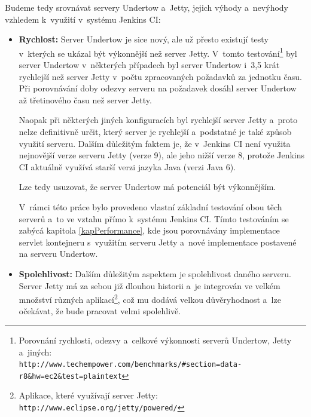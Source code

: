             \medskip
            Budeme tedy srovnávat servery Undertow a~Jetty, jejich výhody a~nevýhody
            vzhledem k~využití v~systému Jenkins CI:
            \begin{itemize}
                \item {\textbf{Rychlost:} Server Undertow je sice nový, ale už přesto existují
                    testy v~kterých se ukázal být výkonnější než server Jetty. V~tomto           
                    testování\footnote{Porovnání rychlosti, odezvy a~celkové výkonnosti serverů Undertow, Jetty a~jiných: 
                    \\\texttt{http://www.techempower.com/benchmarks/\#section=data-r8\&hw=ec2\&test=plaintext}}
                    byl server Undertow v~některých případech byl server 
                    Undertow i~3,5 krát rychlejší než server Jetty v~počtu zpracovaných 
                    požadavků za jednotku času. Při porovnávání doby odezvy serveru na požadavek 
                    dosáhl server Undertow až třetinového času než server Jetty. 
                    
                    Naopak při některých
                    jiných konfiguracích byl rychlejší server Jetty a~proto nelze definitivně určit,
                    který server je rychlejší a~podstatné je také způsob využití serveru. 
                    Dalším důležitým faktem je, že v~Jenkins CI není využita nejnovější verze serveru
                    Jetty (verze 9), ale jeho nižší verze 8, protože Jenkins CI aktuálně využívá
                    starší verzi jazyka Java (verzi Java 6).
                    
                    Lze tedy usuzovat, že server Undertow má potenciál být výkonnějším.
        
                    V~rámci této práce bylo provedeno vlastní základní testování 
                    obou těch serverů a~to ve vztahu přímo k~systému Jenkins CI. Tímto testováním
                    se zabýcá kapitola \ref{kapPerformance}, kde jsou porovnávány 
                    implementace servlet kontejneru s~využitím serveru Jetty a~nové implementace 
                    postavené na serveru Undertow.
                    }

                \item{\textbf{Spolehlivost:} Dalším důležitým aspektem je spolehlivost daného serveru. 
                        Server Jetty má za sebou již dlouhou historii a~je integrován ve velkém množství
                        různých aplikací\footnote{Aplikace, které využívají server Jetty: \texttt{http://www.eclipse.org/jetty/powered/}},
                        což mu dodává velkou důvěryhodnost a~lze očekávat, že bude pracovat velmi 
                        spolehlivě. 
                        
}
\end{itemize}
